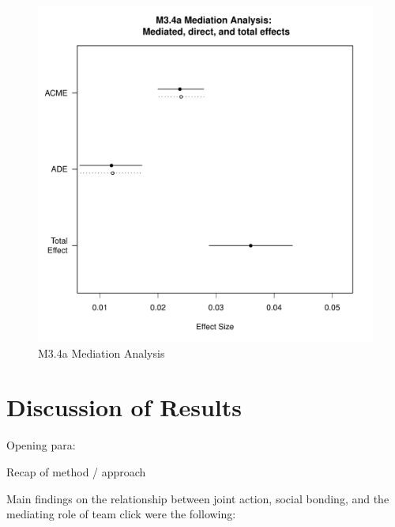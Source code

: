 \begin{CJK}{UTF8}{gbsn}
    \begin{figure}[htbp]
      \includegraphics[scale=.5]{images/MLM34aMediationAnalysis.pdf}
      \caption{M3.4a Mediation Analysis}
      \label{fig:MLM34aMediationAnalysis}
    \end{figure}



\clearpage























\clearpage

\section{Discussion of Results}

Opening para:

Recap of method / approach


Main findings on the relationship between joint action, social bonding, and the mediating role of team click were the following:


\end{CJK}
